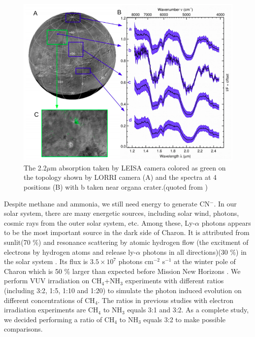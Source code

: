 \begin{figure}
\centering
\includegraphics[width=\textwidth]{figures/chapter1/IR.png}
\caption{The 2.2$\mu$m absorption taken by LEISA camera colored as green on the topology shown by LORRI camera (A) and the spectra at 4 positions (B) with b taken near organa crater.(quoted from \cite{grundy2016surface})}
\label{fig:Charon_IR}
\end{figure}

Despite methane and ammonia, we still need energy to generate CN$^-$. In our solar system, there are many energetic sources, including solar wind, photons, cosmic rays from the outer solar system, etc. Among these, Ly-$\alpha$ photons appears to be the most important source in the dark side of Charon. It is attributed from sunlit(70 \%) and resonance scattering by atomic hydrogen flow (the excitment of electrons by hydrogen atoms and release ly-$\alpha$ photons in all directions)(30 \%) in the solar system \cite{grundy2016formation}. Its flux is $3.5 \times 10^7$ photons cm$^{-2}$ s$^{-1}$ at the winter pole of Charon \cite{grundy2016formation} which is 50 \% larger than expected before Mission New Horizons \cite{gladstone2015lyalpha}. We perform VUV irradiation on CH$_4$+NH$_3$ experiments with different ratios (including 3:2, 1:5, 1:10 and 1:20) to simulate the photon induced evolution on different concentrations of CH$_4$. The ratios in previous studies with electron irradiation experiments are CH$_4$ to NH$_3$ equals 3:1\cite{kim} and 3:2\cite{kundu2017electron}. As a complete study, we decided performing a ratio of CH$_4$ to NH$_3$ equals 3:2 to make possible comparisons.

